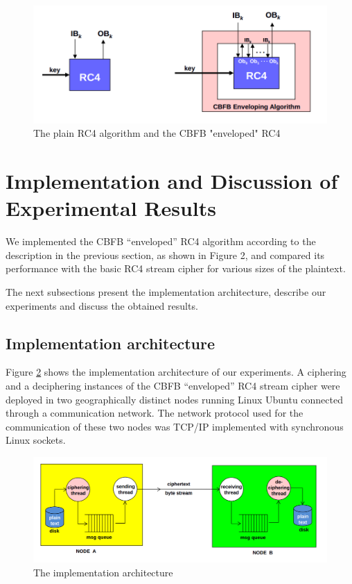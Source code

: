 \documentclass[conference]{IEEEtran}
\begin{document}
\begin{figure}[!t]
	\centering
	\includegraphics[scale=0.3]{figure2.png}
	\caption{The plain RC4 algorithm and the CBFB "enveloped" RC4}
	\label{rc4-cbfb-algorithm}
\end{figure}


\section{Implementation and Discussion of Experimental Results}

We implemented the CBFB “enveloped” RC4 algorithm according to the description in the previous section, as shown in Figure 2, and compared its performance with the basic RC4 stream cipher for various sizes of the plaintext. 

The next subsections present the implementation architecture, describe our experiments and discuss the obtained results.

\subsection{Implementation architecture}

Figure \ref{architecture} shows the implementation architecture of our experiments. A ciphering and a deciphering instances of the CBFB “enveloped” RC4 stream cipher were deployed in two geographically distinct nodes running Linux Ubuntu connected through a communication network. The network protocol used for the communication of these two nodes was TCP/IP implemented with synchronous Linux sockets.

\begin{figure}[!t]
	\centering
	\includegraphics[scale=0.20]{figure3.png}
	\caption{The implementation architecture}
	\label{architecture}
\end{figure}
\end{document}
